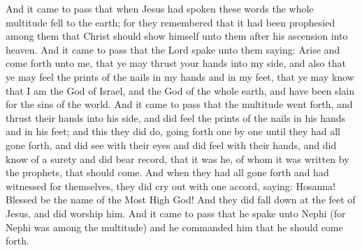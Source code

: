 And it came to pass that when Jesus had spoken these words the whole multitude fell to the earth; for they remembered that it had been prophesied among them that Christ should show himself unto them after his ascension into heaven.
\bverse \iffalse And it came to pass that the Lord spake unto them saying: \fi
And it came to pass that the Lord spake unto them saying:
\bverse \iffalse Arise and come forth unto me, that ye may thrust your hands into my side, and also that ye may feel the prints of the nails in my hands and in my feet, that ye may know that I am the God of Israel, and the God of the whole earth, and have been slain for the sins of the world. \fi
Arise and come forth unto me, that ye may thrust your hands into my side, and also that ye may feel the prints of the nails in my hands and in my feet, that ye may know that I am the God of Israel, and the God of the whole earth, and have been slain for the sins of the world.
\bverse \iffalse And it came to pass that the multitude went forth, and thrust their hands into his side, and did feel the prints of the nails in his hands and in his feet; and this they did do, going forth one by one until they had all gone forth, and did see with their eyes and did feel with their hands, and did know of a surety and did bear record, that it was he, of whom it was written by the prophets, that should come. \fi
And it came to pass that the multitude went forth, and thrust their hands into his side, and did feel the prints of the nails in his hands and in his feet; and this they did do, going forth one by one until they had all gone forth, and did see with their eyes and did feel with their hands, and did know of a surety and did bear record, that it was he, of whom it was written by the prophets, that should come.
\bverse \iffalse And when they had all gone forth and had witnessed for themselves, they did cry out with one accord, saying: \fi
And when they had all gone forth and had witnessed for themselves, they did cry out with one accord, saying:
\bverse \iffalse Hosanna! Blessed be the name of the Most High God! And they did fall down at the feet of Jesus, and did worship him. \fi
Hosanna! Blessed be the name of the Most High God! And they did fall down at the feet of Jesus, and did worship him.
\bverse \iffalse And it came to pass that he spake unto Nephi (for Nephi was among the multitude) and he commanded him that he should come forth. \fi
And it came to pass that he spake unto Nephi (for Nephi was among the multitude) and he commanded him that he should come forth.
